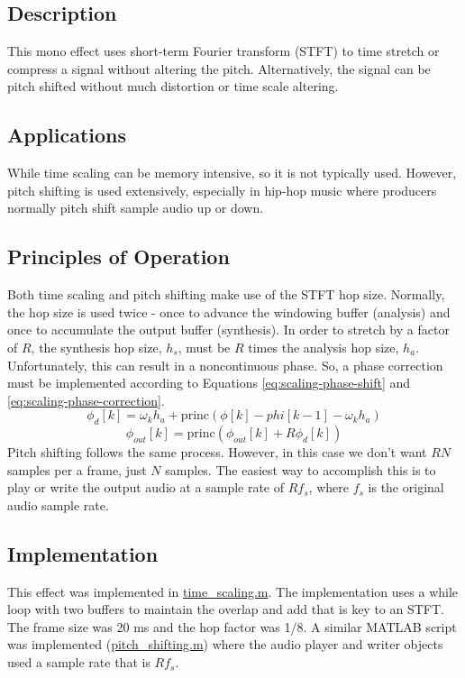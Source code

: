\subsection{Description}
This mono effect uses short-term Fourier transform (STFT) to time stretch or compress a signal without altering the pitch. Alternatively, the signal can be pitch shifted without much distortion or time scale altering.

\subsection{Applications}
While time scaling can be memory intensive, so it is not typically used. However, pitch shifting is used extensively, especially in hip-hop music where producers normally pitch shift sample audio up or down.

\subsection{Principles of Operation}
Both time scaling and pitch shifting make use of the STFT hop size. Normally, the hop size is used twice - once to advance the windowing buffer (analysis) and once to accumulate the output buffer (synthesis). In order to stretch by a factor of $R$, the synthesis hop size, $h_s$, must be $R$ times the analysis hop size, $h_a$. Unfortunately, this can result in a noncontinuous phase. So, a phase correction must be implemented according to Equations \ref{eq:scaling-phase-shift} and \ref{eq:scaling-phase-correction}.
\begin{equation}
    \phi_d[k] = \omega_k h_a + \mathrm{princ}(\phi[k] - phi[k - 1] - \omega_k h_a)
    \label{eq:scaling-phase-shift}
\end{equation}
\begin{equation}
    \phi_{out}[k] = \mathrm{princ}(\phi_{out}[k] + R \phi_d[k])
    \label{eq:scaling-phase-correction}
\end{equation}
Pitch shifting follows the same process. However, in this case we don't want $RN$ samples per a frame, just $N$ samples. The easiest way to accomplish this is to play or write the output audio at a sample rate of $R f_s$, where $f_s$ is the original audio sample rate.

\subsection{Implementation}
This effect was implemented in \href{run:../time_scaling.m}{time\_scaling.m}. The implementation uses a while loop with two buffers to maintain the overlap and add that is key to an STFT. The frame size was 20 ms and the hop factor was 1/8. A similar MATLAB script was implemented (\href{run:../pitch_shifting.m}{pitch\_shifting.m}) where the audio player and writer objects used a sample rate that is $R f_s$.

